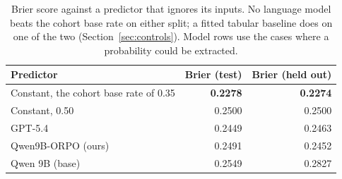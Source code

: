 \documentclass[11pt]{article}
\begin{document}
\begin{table}[H]
\centering
\small
\begin{tabular}{lrr}
\toprule
\textbf{Predictor} & \textbf{Brier (test)} & \textbf{Brier (held out)} \\
\midrule
Constant, the cohort base rate of 0.35 & \textbf{0.2278} & \textbf{0.2274} \\
Constant, 0.50 & 0.2500 & 0.2500 \\
\midrule
GPT-5.4 & 0.2449 & 0.2463 \\
Qwen9B-ORPO (ours) & 0.2491 & 0.2452 \\
Qwen 9B (base) & 0.2549 & 0.2827 \\
\bottomrule
\end{tabular}
\caption{Brier score against a predictor that ignores its inputs. No language
model beats the cohort base rate on either split; a fitted tabular baseline does
on one of the two (Section~\ref{sec:controls}). Model rows use the cases where a
probability could be extracted.}
\label{tab:baserate}
\end{table}
\end{document}
